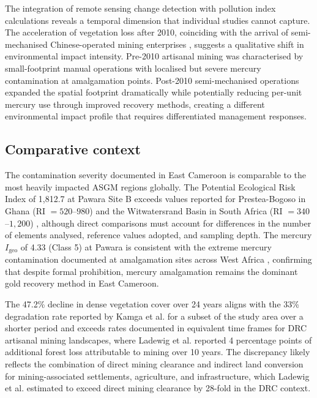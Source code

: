 \documentclass[preprint,12pt,authoryear]{elsarticle}
\begin{document}
The integration of remote sensing change detection with pollution index calculations reveals a temporal dimension that individual studies cannot capture. The acceleration of vegetation loss after 2010, coinciding with the arrival of semi-mechanised Chinese-operated mining enterprises \citep{Weng2022}, suggests a qualitative shift in environmental impact intensity. Pre-2010 artisanal mining was characterised by small-footprint manual operations with localised but severe mercury contamination at amalgamation points. Post-2010 semi-mechanised operations expanded the spatial footprint dramatically while potentially reducing per-unit mercury use through improved recovery methods, creating a different environmental impact profile that requires differentiated management responses.

\subsection{Comparative context}

The contamination severity documented in East Cameroon is comparable to the most heavily impacted ASGM regions globally. The Potential Ecological Risk Index of 1,812.7 at Pawara Site B exceeds values reported for Prestea-Bogoso in Ghana (RI $= 520$--$980$) \citep{Obiri2016} and the Witwatersrand Basin in South Africa (RI $= 340$--$1,200$) \citep{Kamunda2016}, although direct comparisons must account for differences in the number of elements analysed, reference values adopted, and sampling depth. The mercury $I_\text{geo}$ of 4.33 (Class 5) at Pawara is consistent with the extreme mercury contamination documented at amalgamation sites across West Africa \citep{Spiegel2005}, confirming that despite formal prohibition, mercury amalgamation remains the dominant gold recovery method in East Cameroon.

The 47.2\% decline in dense vegetation cover over 24 years aligns with the 33\% degradation rate reported by Kamga et al. \citep{Kamga2020} for a subset of the study area over a shorter period and exceeds rates documented in equivalent time frames for DRC artisanal mining landscapes, where Ladewig et al. \citep{Ladewig2024} reported 4 percentage points of additional forest loss attributable to mining over 10 years. The discrepancy likely reflects the combination of direct mining clearance and indirect land conversion for mining-associated settlements, agriculture, and infrastructure, which Ladewig et al. estimated to exceed direct mining clearance by 28-fold in the DRC context.
\end{document}
